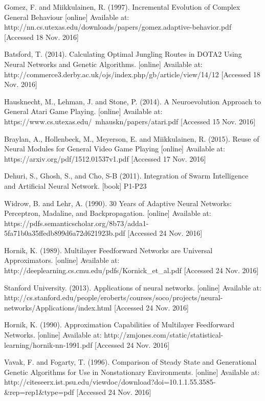 \documentclass[11pt,a4paper]{article}
\begin{document}
\begin{thebibliography}{10}
	Gomez, F. and Miikkulainen, R.
	(1997).
	Incremental Evolution of Complex General Behaviour
	[online]
	Available at: http://nn.cs.utexas.edu/downloads/papers/gomez.adaptive-behavior.pdf
	[Accessed 18 Nov. 2016]
	
	Batsford, T.
	(2014).
	Calculating Optimal Jungling Routes in DOTA2 Using Neural Networks and Genetic Algorithms.
	[online]
	Available at: http://commerce3.derby.ac.uk/ojs/index.php/gb/article/view/14/12
	[Accessed 18 Nov. 2016]
	
	Hausknecht, M., Lehman, J. and Stone, P.
	(2014).
	A Neuroevolution Approach to General Atari Game Playing.
	[online]
	Available at: https://www.cs.utexas.edu/~mhauskn/papers/atari.pdf
	[Accessed 15 Nov. 2016]
	
	Braylan, A., Hollenbeck, M., Meyerson, E. and Miikkulainen, R.
	(2015).
	Reuse of Neural Modules for General Video Game Playing
	[online]
	Available at: https://arxiv.org/pdf/1512.01537v1.pdf
	[Accessed 17 Nov. 2016]
	
	Dehuri, S., Ghosh, S., and Cho, S-B
	(2011).
	Integration of Swarm Intelligence and Artificial Neural Network.
	[book]
	P1-P23

	Widrow, B. and Lehr, A.
	(1990).
	30 Years of Adaptive Neural Networks: Perceptron, Madaline, and Backpropagation.
	[online]
	Available at: https://pdfs.semanticscholar.org/8b73/adda1-5fa71b0a35ffedb899d6a72d621923b.pdf
	[Accessed 24 Nov. 2016]
	
	Hornik, K.
	(1989).
	Multilayer Feedforward Networks are Universal Approximators.
	[online]
	Available at: http://deeplearning.cs.cmu.edu/pdfs/Kornick\_et\_al.pdf
	[Accessed 24 Nov. 2016]
	
	Stanford University.
	(2013).
	Applications of neural networks.
	[online]
	Available at: http://cs.stanford.edu/people/eroberts/courses/soco/projects/neural-networks/Applications/index.html
	[Accessed 24 Nov. 2016]
	
	Hornik, K.
	(1990).
	Approximation Capabilities of Multilayer Feedforward Networks.
	[online]
	Available at: http://zmjones.com/static/statistical-learning/hornik-nn-1991.pdf
	[Accessed 24 Nov. 2016]
	
	Vavak, F. and Fogarty, T.
	(1996).
	Comparison of Steady State and Generational Genetic Algorithms for Use in Nonstationary Environments.
	[online]
	Available at: http://citeseerx.ist.psu.edu/viewdoc/download?doi=10.1.1.55.3585-\&rep=rep1\&type=pdf
	[Accessed 24 Nov. 2016]
	

\end{thebibliography}
\end{document}
